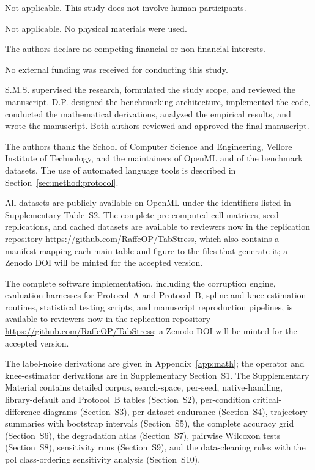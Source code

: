 \documentclass[pdflatex,sn-mathphys]{sn-jnl}
\theoremstyle{thmstyleone}
\theoremstyle{thmstyletwo}
\theoremstyle{thmstylethree}
\begin{document}
Not applicable. This study does not involve human participants.

Not applicable. No physical materials were used.

The authors declare no competing financial or non-financial interests.

No external funding was received for conducting this study.

S.M.S. supervised the research, formulated the study scope, and reviewed the manuscript. D.P. designed the benchmarking architecture, implemented the code, conducted the mathematical derivations, analyzed the empirical results, and wrote the manuscript. Both authors reviewed and approved the final manuscript.

The authors thank the School of Computer Science and Engineering, Vellore Institute of Technology, and the maintainers of OpenML and of the benchmark datasets. The use of automated language tools is described in Section~\ref{sec:method:protocol}.

All datasets are publicly available on OpenML under the identifiers listed in Supplementary Table~S2. The complete pre-computed cell matrices, seed replications, and cached datasets are available to reviewers now in the replication repository \url{https://github.com/RaffeOP/TabStress}, which also contains a manifest mapping each main table and figure to the files that generate it; a Zenodo DOI will be minted for the accepted version.

The complete software implementation, including the corruption engine, evaluation harnesses for Protocol~A and Protocol~B, spline and knee estimation routines, statistical testing scripts, and manuscript reproduction pipelines, is available to reviewers now in the replication repository \url{https://github.com/RaffeOP/TabStress}; a Zenodo DOI will be minted for the accepted version.

The label-noise derivations are given in Appendix~\ref{app:math}; the operator and knee-estimator derivations are in Supplementary Section~S1. The Supplementary Material contains detailed corpus, search-space, per-seed, native-handling, library-default and Protocol~B tables (Section~S2), per-condition critical-difference diagrams (Section~S3), per-dataset endurance (Section~S4), trajectory summaries with bootstrap intervals (Section~S5), the complete accuracy grid (Section~S6), the degradation atlas (Section~S7), pairwise Wilcoxon tests (Section~S8), sensitivity runs (Section~S9), and the data-cleaning rules with the pol class-ordering sensitivity analysis (Section~S10).
\end{document}
